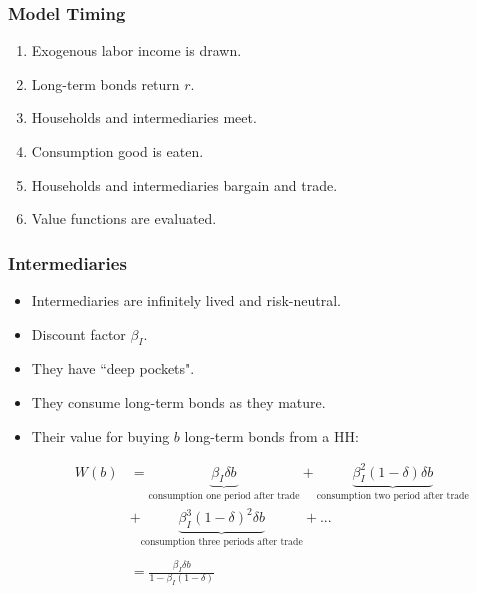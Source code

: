 \documentclass[handout]{beamer}
\begin{document}
\begin{frame}
\frametitle{Model Timing}

\begin{enumerate}[<+->]

\item Exogenous labor income is drawn.
\item Long-term bonds return $r$.
\item Households and intermediaries meet.
\item Consumption good is eaten.
\item Households and intermediaries bargain and trade.
\item Value functions are evaluated.

\end{enumerate}

\end{frame}





\begin{frame}
\frametitle{Intermediaries}

\begin{itemize}[<+->]

\item Intermediaries are infinitely lived and risk-neutral.
\item Discount factor $\beta_I$.
\item They have ``deep pockets".
\item They consume long-term bonds as they mature.
\item Their value for buying $b$ long-term bonds from a HH:

\begin{align*}
W(b) 
&= \underbrace{\beta_I\delta b}_{\text{consumption one period after trade}} + \underbrace{\beta_I^2(1-\delta)\delta b}_{\text{consumption two period after trade}} \\
&+ \underbrace{\beta_I^3(1-\delta)^2\delta b}_{\text{consumption three periods after trade}} + ...\\\\
&= \frac{\beta_I\delta b }{1 - \beta_I (1-\delta)}
\end{align*}

\end{itemize}

\end{frame}
\end{document}
